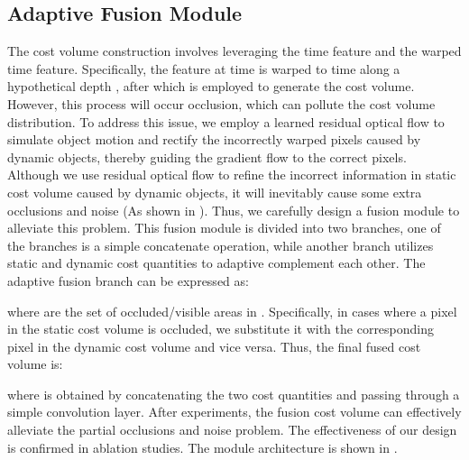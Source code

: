 \documentclass[journal]{IEEEtran}
\begin{document}
\subsection{Adaptive Fusion Module}
\label{sec:4.3}
The cost volume construction involves leveraging the time  feature and the warped time  feature. Specifically, the feature  at time  is warped to time  along a hypothetical depth , after which  is employed to generate the cost volume. However, this process will occur occlusion, which can pollute the cost volume distribution. To address this issue, we employ a learned residual optical flow to simulate object motion and rectify the incorrectly warped pixels caused by dynamic objects, thereby guiding the gradient flow to the correct pixels. Although we use residual optical flow to refine the incorrect information in static cost volume caused by dynamic objects, it will inevitably cause some extra occlusions and noise (As shown in ). Thus, we carefully design a fusion module to alleviate this problem. This fusion module is divided into two branches, one of the branches is a simple concatenate operation, while another branch utilizes static and dynamic cost quantities to adaptive complement each other. The adaptive fusion branch can be expressed as:

where  are the set of occluded/visible areas in . Specifically, in cases where a pixel in the static cost volume is occluded, we substitute it with the corresponding pixel in the dynamic cost volume and vice versa. Thus, the final fused cost volume is:

where  is obtained by concatenating the two cost quantities and passing through a simple convolution layer. After experiments, the fusion cost volume can effectively alleviate the partial occlusions and noise problem. The effectiveness of our design is confirmed in ablation studies. The module architecture is shown in .
\end{document}
